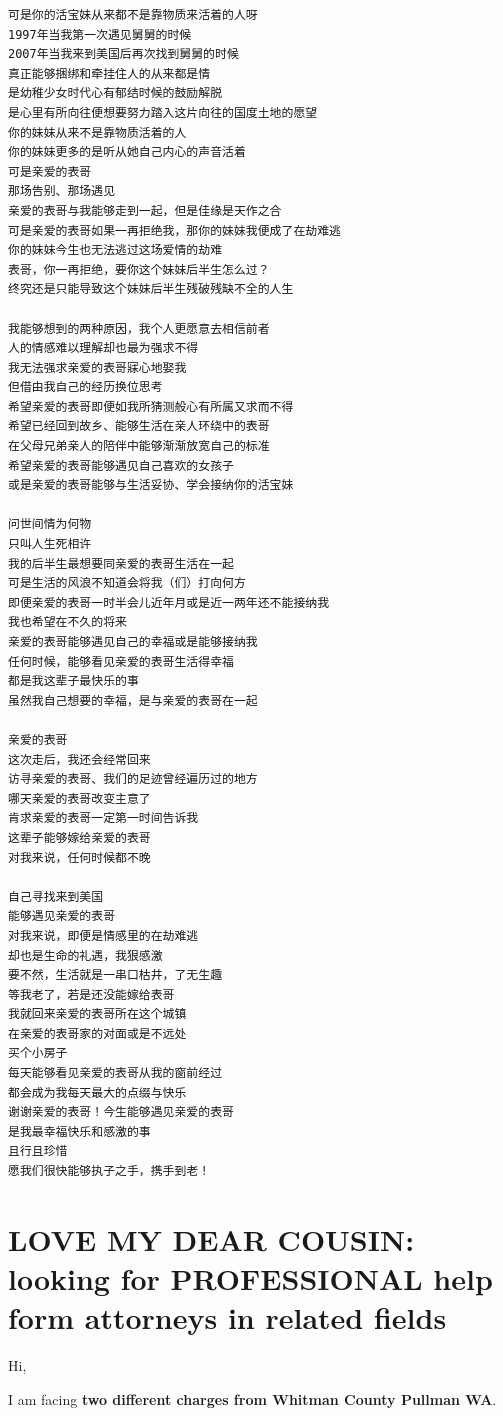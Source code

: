 \documentclass[9pt, b5paaper]{book}
\begin{document}
\begin{itemize}
\begin{verbatim}
可是你的活宝妹从来都不是靠物质来活着的人呀
1997年当我第一次遇见舅舅的时候
2007年当我来到美国后再次找到舅舅的时候
真正能够捆绑和牵挂住人的从来都是情
是幼稚少女时代心有郁结时候的鼓励解脱
是心里有所向往便想要努力踏入这片向往的国度土地的愿望
你的妹妹从来不是靠物质活着的人
你的妹妹更多的是听从她自己内心的声音活着
可是亲爱的表哥
那场告别、那场遇见
亲爱的表哥与我能够走到一起，但是佳缘是天作之合
可是亲爱的表哥如果一再拒绝我，那你的妹妹我便成了在劫难逃
你的妹妹今生也无法逃过这场爱情的劫难
表哥，你一再拒绝，要你这个妹妹后半生怎么过？
终究还是只能导致这个妹妹后半生残破残缺不全的人生

我能够想到的两种原因，我个人更愿意去相信前者
人的情感难以理解却也最为强求不得
我无法强求亲爱的表哥寐心地娶我
但借由我自己的经历换位思考
希望亲爱的表哥即便如我所猜测般心有所属又求而不得
希望已经回到故乡、能够生活在亲人环绕中的表哥
在父母兄弟亲人的陪伴中能够渐渐放宽自己的标准
希望亲爱的表哥能够遇见自己喜欢的女孩子
或是亲爱的表哥能够与生活妥协、学会接纳你的活宝妹

问世间情为何物
只叫人生死相许
我的后半生最想要同亲爱的表哥生活在一起
可是生活的风浪不知道会将我（们）打向何方
即便亲爱的表哥一时半会儿近年月或是近一两年还不能接纳我
我也希望在不久的将来
亲爱的表哥能够遇见自己的幸福或是能够接纳我
任何时候，能够看见亲爱的表哥生活得幸福
都是我这辈子最快乐的事
虽然我自己想要的幸福，是与亲爱的表哥在一起

亲爱的表哥
这次走后，我还会经常回来
访寻亲爱的表哥、我们的足迹曾经遍历过的地方
哪天亲爱的表哥改变主意了
肯求亲爱的表哥一定第一时间告诉我
这辈子能够嫁给亲爱的表哥
对我来说，任何时候都不晚

自己寻找来到美国
能够遇见亲爱的表哥
对我来说，即便是情感里的在劫难逃
却也是生命的礼遇，我狠感激
要不然，生活就是一串口枯井，了无生趣
等我老了，若是还没能嫁给表哥
我就回来亲爱的表哥所在这个城镇
在亲爱的表哥家的对面或是不远处
买个小房子
每天能够看见亲爱的表哥从我的窗前经过
都会成为我每天最大的点缀与快乐
谢谢亲爱的表哥！今生能够遇见亲爱的表哥
是我最幸福快乐和感激的事
且行且珍惜
愿我们很快能够执子之手，携手到老！
\end{verbatim}
\end{itemize}

\chapter{LOVE MY DEAR COUSIN: looking for PROFESSIONAL help form attorneys in related fields}
\label{sec-9}
Hi, 

I am facing \textbf{two different charges from Whitman
County Pullman WA}. 
\end{document}
